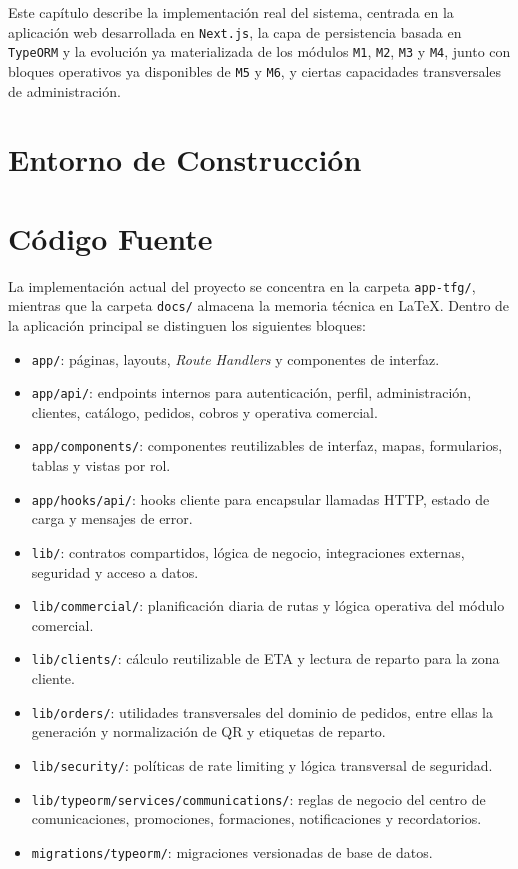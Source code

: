Este capítulo describe la implementación real del sistema, centrada en la aplicación web desarrollada en \texttt{Next.js}, la capa de persistencia basada en \texttt{TypeORM} y la evolución ya materializada de los módulos \texttt{M1}, \texttt{M2}, \texttt{M3} y \texttt{M4}, junto con bloques operativos ya disponibles de \texttt{M5} y \texttt{M6}, y ciertas capacidades transversales de administración.

\section{Entorno de Construcción}
\label{sec:ConstructionEnvironment}


\section{Código Fuente}

La implementación actual del proyecto se concentra en la carpeta \texttt{app-tfg/}, mientras que la carpeta \texttt{docs/} almacena la memoria técnica en \LaTeX. Dentro de la aplicación principal se distinguen los siguientes bloques:

\begin{itemize}
    \item \texttt{app/}: páginas, layouts, \textit{Route Handlers} y componentes de interfaz.
    \item \texttt{app/api/}: endpoints internos para autenticación, perfil, administración, clientes, catálogo, pedidos, cobros y operativa comercial.
    \item \texttt{app/components/}: componentes reutilizables de interfaz, mapas, formularios, tablas y vistas por rol.
    \item \texttt{app/hooks/api/}: hooks cliente para encapsular llamadas HTTP, estado de carga y mensajes de error.
    \item \texttt{lib/}: contratos compartidos, lógica de negocio, integraciones externas, seguridad y acceso a datos.
    \item \texttt{lib/commercial/}: planificación diaria de rutas y lógica operativa del módulo comercial.
    \item \texttt{lib/clients/}: cálculo reutilizable de ETA y lectura de reparto para la zona cliente.
    \item \texttt{lib/orders/}: utilidades transversales del dominio de pedidos, entre ellas la generación y normalización de QR y etiquetas de reparto.
    \item \texttt{lib/security/}: políticas de rate limiting y lógica transversal de seguridad.
    \item \texttt{lib/typeorm/services/communications/}: reglas de negocio del centro de comunicaciones, promociones, formaciones, notificaciones y recordatorios.
    \item \texttt{migrations/typeorm/}: migraciones versionadas de base de datos.
\end{itemize}

